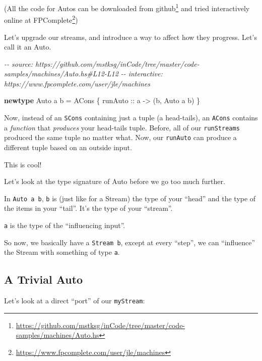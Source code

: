 \documentclass[]{article}
\newenvironment{Shaded}{}{}
\newcommand{\CommentTok}[1]{\textcolor[rgb]{0.38,0.63,0.69}{\textit{#1}}}
\newcommand{\DataTypeTok}[1]{\textcolor[rgb]{0.56,0.13,0.00}{#1}}
\newcommand{\KeywordTok}[1]{\textcolor[rgb]{0.00,0.44,0.13}{\textbf{#1}}}
\newcommand{\NormalTok}[1]{#1}
\newcommand{\OtherTok}[1]{\textcolor[rgb]{0.00,0.44,0.13}{#1}}
\renewcommand{\href}[2]{#2\footnote{\url{#1}}}
\begin{document}
(All the code for Autos can be downloaded
\href{https://github.com/mstksg/inCode/tree/master/code-samples/machines/Auto.hs}{from
github} and tried interactively online
\href{https://www.fpcomplete.com/user/jle/machines}{at FPComplete})

Let's upgrade our streams, and introduce a way to affect how they progress.
Let's call it an Auto.

\begin{Shaded}
\begin{Highlighting}[]
\CommentTok{{-}{-} source: https://github.com/mstksg/inCode/tree/master/code{-}samples/machines/Auto.hs\#L12{-}L12}
\CommentTok{{-}{-} interactive: https://www.fpcomplete.com/user/jle/machines}

\KeywordTok{newtype} \DataTypeTok{Auto}\NormalTok{ a b }\OtherTok{=} \DataTypeTok{ACons}\NormalTok{ \{}\OtherTok{ runAuto ::}\NormalTok{ a }\OtherTok{{-}\textgreater{}}\NormalTok{ (b, }\DataTypeTok{Auto}\NormalTok{ a b) \}}
\end{Highlighting}
\end{Shaded}

Now, instead of an \texttt{SCons} containing just a tuple (a head-tails), an
\texttt{ACons} contains a \emph{function} that \emph{produces} your head-tails
tuple. Before, all of our \texttt{runStreams} produced the same tuple no matter
what. Now, our \texttt{runAuto} can produce a different tuple based on an
outside input.

This is cool!

Let's look at the type signature of Auto before we go too much further.

In \texttt{Auto\ a\ b}, \texttt{b} is (just like for a Stream) the type of your
``head'' and the type of the items in your ``tail''. It's the type of your
``stream''.

\texttt{a} is the type of the ``influencing input''.

So now, we basically have a \texttt{Stream\ b}, except at every ``step'', we can
``influence'' the Stream with something of type \texttt{a}.

\subsection{A Trivial Auto}\label{a-trivial-auto}

Let's look at a direct ``port'' of our \texttt{myStream}:
\end{document}
